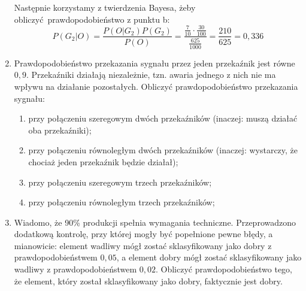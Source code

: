 \documentclass[twoside]{mwart}
\newcommand{\ans}[1]{}
\newcommand{\ans}[1]{\par\emph{Odpowiedź:} #1}
\begin{document}
\begin{enumerate}
{	Następnie korzystamy z twierdzenia Bayesa, żeby obliczyć prawdopodobieństwo z punktu b:
	\[ P(G_2|O) = \frac{P(O|G_2)P(G_2)}{P(O)} = \frac{\frac{7}{10}\cdot\frac{30}{100}}{\frac{625}{1000}} = \frac{210}{625}= 0{,}336 \]
}
\item Prawdopodobieństwo przekazania sygnału przez jeden przekaźnik jest równe $0{,}9$. Przekaźniki działają niezależnie, tzn. awaria jednego z nich nie ma wpływu na działanie pozostałych.
Obliczyć prawdopodobieństwo przekazania sygnału:
\begin{enumerate}
\item przy połączeniu szeregowym dwóch przekaźników (inaczej: muszą działać oba przekaźniki);
\item przy połączeniu równoległym dwóch przekaźników (inaczej: wystarczy, że chociaż jeden przekaźnik będzie działał);
\item przy połączeniu szeregowym trzech przekaźników;
\item przy połączeniu równoległym trzech przekaźników;
\end{enumerate}
\ans{
	Oznaczamy zdarzenia:
	\begin{itemize}
		\item $A$ działa 1. przekaźnik
		\item $B$ działa 2. przekaźnik
		\item $C$ działa 3. przekaźnik
	\end{itemize}
	Zdarzenia są niezależne i każde zachodzi z prawdopodobieństwem $0{,}9$.
	Zatem:
	\begin{enumerate}
		\item \[ P(A\cap B)\underset{\text{z niezależności}}{=}P(A)\cdot P(B)=0{,}9\cdot0{,}9=0{,}81 \]
		\item Interesuje nas $P(A\cup B)$. Możemy skorzystać z prawa de Morgana:
		\[P(A\cup B)=P([A'\cap B']')=1-P(A'\cap B') \]
		A następnie z twierdzenia o niezależności zdarzeń przeciwnych:
		\[P(A'\cap B') = P(A')P(B')=(1-0{,}9)^2=0{,}01\]
		Wracając do pierwszego równania otrzymujemy
		\[P(A\cup B)=1-0{,}01=0{,}99\]
		\item \[ P(A\cap B\cap C)\underset{\text{z niezależności}}{=}P(A)\cdot P(B)\cap P(C)=0{,}9^3=0{,}729 \]
		\item Analogicznie jak punkt b:
		\[ P(A\cup B\cup C)=1-P(A'\cap B'\cap C')=1-(1-0{,}1)^3=0{,}999 \]
	\end{enumerate}
}
\item Wiadomo, że 90\% produkcji spełnia wymagania techniczne. Przeprowadzono dodatkową kontrolę, przy której mogły być popełnione pewne błędy, a mianowicie: element wadliwy mógł zostać sklasyfikowany jako dobry z prawdopodobieństwem $0{,}05$, a element dobry mógł zostać sklasyfikowany jako wadliwy z prawdopodobieństwem $0{,}02$. Obliczyć prawdopodobieństwo tego, że element, który został sklasyfikowany jako dobry, faktycznie jest dobry.

\end{enumerate}
\end{document}
